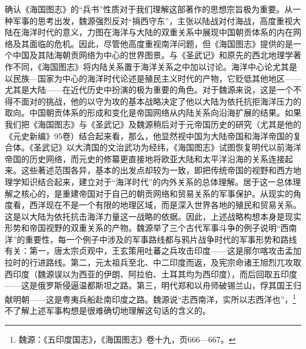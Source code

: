 \documentclass[a4paper, 12pt, openright]{ctexbook}
\begin{document}
确认《海国图志》的“兵书”性质对于我们理解这部著作的思想宗旨极为重要。从一种军事的思考出发，魏源强烈反对“捐西守东”，主张以陆战对付海战，高度重视大陆在海洋时代的意义，力图在海洋与大陆的双重关系中展现中国朝贡体系的内在网络及其面临的危机。因此，尽管他高度重视南洋问题，但《海国图志》提供的是一个中国及其陆海朝贡网络为中心的世界图景。与《圣武记》和原先的西北地理学著作不同，《海国图志》将内陆关系置于海洋关系之中加以讨论。海洋中心论尤其是以民族—国家为中心的海洋时代论述是殖民主义时代的产物，它贬低其他地区——尤其是大陆——在近代历史中扮演的极为重要的角色。对于魏源来说，这是一个不得不面对的挑战，他的以守为攻的基本战略决定了他以大陆为依托抗拒海洋压力的取向。中国朝贡体系的形成和变化是帝国网络从内陆关系向沿海扩展的结果。如果我们把《海国图志》与《圣武记》及魏源稍后对于元帝国历史的研究（尤其是他的《元史新编》95卷）结合起来看，那么，他显然视中国为大陆帝国和海洋帝国的复合体。《圣武记》以大清国的文治武功为经纬，《海国图志》试图恢复明代以前海洋帝国的历史网络，而元史的修纂更直接地将欧亚大陆和太平洋沿海的关系连接起来。这些著述范围各异，基本的出发点却较为一致，即把传统帝国的视野和西方地理学知识结合起来，建立对于“海洋时代”的内外关系的总体理解。居于这一总体理解之核心的，是重建帝国对于自己的朝贡网络和贸易关系的军事保护。从现实的角度看，西洋现在不是一个有限的地理区域，而是深入世界各地的殖民和贸易关系。这是以大陆为依托抗击海洋力量这一战略的依据。因此，上述战略构想本身是现实形势和帝国视野的双重关系的产物。魏源举了三个古代军事斗争的例子说明“西南洋”的重要性，每一个例子中涉及的军事路线都与鸦片战争时代的军事形势和路线有关：第一，唐太宗贞观中，王玄策用吐蕃之兵攻击印度——这是廓尔喀攻击孟加拉时的行进路线。第二，元太祖兵至北、中二印度而返，及宪宗命诸王旭烈兀攻取西印度（魏源误以为西亚的伊朗、阿拉伯、土耳其均为西印度），而后回取五印度——这是俄罗斯侵逼温都斯坦之路。第三，明代郑和以舟师破锡兰山，俘其国王归献明朝——这是粤夷兵船赴南印度之路。魏源说“志西南洋，实所以志西洋也”，\footnote{魏源：《五印度国志》，《海国图志》卷十九，页666—667。}不了解上述军事构想是很难确切地理解这句话的含义的。
\end{document}
